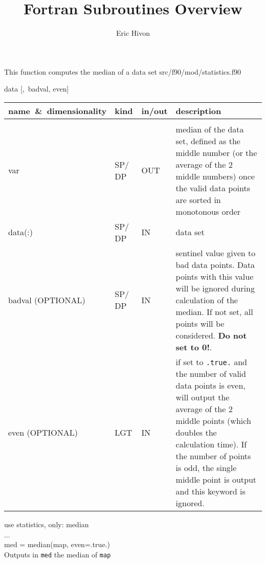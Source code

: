 
\sloppy


\title{\healpix Fortran Subroutines Overview}
 \section[median*]{ }
\label{sub:median}
\author{Eric Hivon}

\begin{facility}
{This function computes the median of a data set}
{src/f90/mod/statistics.f90}
\end{facility}

\begin{f90function}
{data [,~badval, even]}
\end{f90function}

\begin{arguments}
{
\begin{tabular}{p{0.30\hsize} p{0.05\hsize} p{0.05\hsize} p{0.50\hsize}} \hline  
\textbf{name~\&~dimensionality} & \textbf{kind} & \textbf{in/out} & \textbf{description} \\ \hline
                   &   &   &                           \\ %
var & SP/ DP & OUT & median of the data set, defined as the middle number (or
                   the average of the 2 middle numbers) once the valid data points are
                   sorted in monotonous order\\
data(:) & SP/ DP & IN & data set \\
badval \hskip 3cm (OPTIONAL) & SP/ DP & IN & sentinel value given to bad data points. Data points with this
                   value will be ignored during calculation of the median. If
                   not set, all points will be considered. {\bf Do not set to 0!}.\\
even \hskip 4cm (OPTIONAL) & LGT & IN & if set to {\tt .true.} and the number of
                   valid data points is even, will output the average of the 2
                   middle points (which doubles the calculation time). If the
                   number of points is odd, the single middle point is output
                   and this keyword is ignored.
\end{tabular}
}
\end{arguments}

\begin{example}
{
use statistics, only: median \\
... \\
med = median(map, even=.true.)  \\
}
{
Outputs in {\tt med} the median of {\tt map}
}
\end{example}

